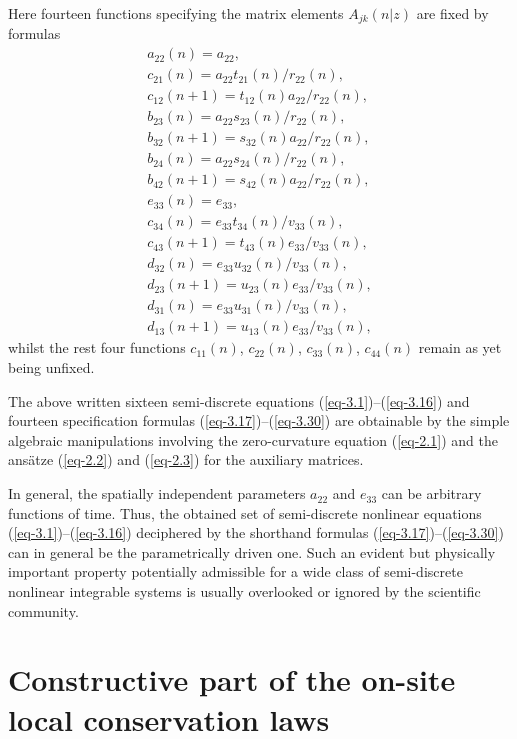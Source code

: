 \documentclass[pdftex]{sigma}
\numberwithin{equation}{section}
\begin{document}
Here fourteen functions specifying the matrix elements $A_{jk}(n|z)$ are fixed by formulas
\begin{gather}\label{eq-3.17}
	a_{22}(n)=a_{22},
\\ \label{eq-3.18}
	c_{21}(n)=a_{22}t_{21}(n)/r_{22}(n),
\\ \label{eq-3.19}
	c_{12}(n+1)=t_{12}(n)a_{22}/r_{22}(n),
\\ \label{eq-3.20}
	b_{23}(n)=a_{22}s_{23}(n)/r_{22}(n),
\\ \label{eq-3.21}
	b_{32}(n+1)=s_{32}(n)a_{22}/r_{22}(n),
\\ \label{eq-3.22}
	b_{24}(n)=a_{22}s_{24}(n)/r_{22}(n),
\\ \label{eq-3.23}
	b_{42}(n+1)=s_{42}(n)a_{22}/r_{22}(n),
\\ \label{eq-3.24}
	e_{33}(n)=e_{33},
\\ \label{eq-3.25}
	c_{34}(n)=e_{33}t_{34}(n)/v_{33}(n),
\\ \label{eq-3.26}
	c_{43}(n+1)=t_{43}(n)e_{33}/v_{33}(n),
\\ \label{eq-3.27}
	d_{32}(n)=e_{33}u_{32}(n)/v_{33}(n),
\\ \label{eq-3.28}
	d_{23}(n+1)=u_{23}(n)e_{33}/v_{33}(n),
\\ \label{eq-3.29}
	d_{31}(n)=e_{33}u_{31}(n)/v_{33}(n),
\\ \label{eq-3.30}
	d_{13}(n+1)=u_{13}(n)e_{33}/v_{33}(n) ,
\end{gather}
whilst the rest four functions $c_{11}(n)$, $c_{22}(n)$, $c_{33}(n)$, $c_{44}(n)$ remain as yet being unfixed.

The above written sixteen semi-discrete equations (\ref{eq-3.1})--(\ref{eq-3.16}) and fourteen specification formulas (\ref{eq-3.17})--(\ref{eq-3.30}) are obtainable by the simple algebraic manipulations involving the zero-curvature equation (\ref{eq-2.1}) and the ans\"{a}tze (\ref{eq-2.2}) and (\ref{eq-2.3}) for the auxiliary matrices.

In general, the spatially independent parameters $a_{22}$ and $e_{33}$ can be arbitrary functions of time. Thus, the obtained set of semi-discrete nonlinear equations (\ref{eq-3.1})--(\ref{eq-3.16}) deciphered by the shorthand formulas (\ref{eq-3.17})--(\ref{eq-3.30}) can in general be the parametrically driven one. Such an evident but physically important property potentially admissible for a wide class of semi-discrete nonlinear integrable systems is usually overlooked or ignored by the scientific community.

\section{Constructive part of the on-site local conservation laws}
\end{document}
